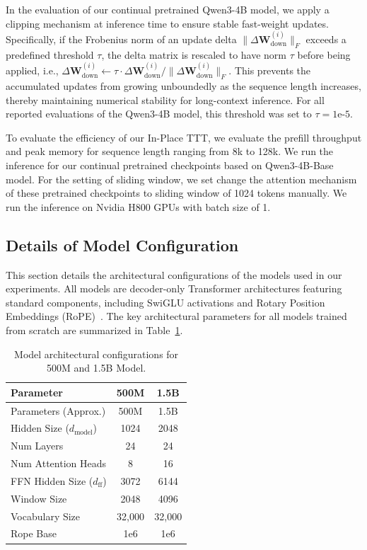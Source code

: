 In the evaluation of our continual pretrained Qwen3-4B model, we apply a clipping mechanism at inference time to ensure stable fast-weight updates. Specifically, if the Frobenius norm of an update delta $\|\Delta \mathbf{W}_{\text{down}}^{(i)}\|_F$ exceeds a predefined threshold $\tau$, the delta matrix is rescaled to have norm $\tau$ before being applied, i.e., $\Delta \mathbf{W}_{\text{down}}^{(i)} \leftarrow \tau \cdot \Delta \mathbf{W}_{\text{down}}^{(i)} / \|\Delta \mathbf{W}_{\text{down}}^{(i)}\|_F$. This prevents the accumulated updates from growing unboundedly as the sequence length increases, thereby maintaining numerical stability for long-context inference. For all reported evaluations of the Qwen3-4B model, this threshold was set to $\tau = 1\text{e-5}$.

To evaluate the efficiency of our In-Place TTT, we evaluate the prefill throughput and peak memory for sequence length ranging from 8k to 128k. We run the inference for our continual pretrained checkpoints based on Qwen3-4B-Base model. For the setting of sliding window, we set change the attention mechanism of these pretrained checkpoints to sliding window of 1024 tokens manually. We run the inference on Nvidia H800 GPUs with batch size of 1.




\subsection{Details of Model Configuration}
\label{app:model}



This section details the architectural configurations of the models used in our experiments. All models are decoder-only Transformer architectures featuring standard components, including SwiGLU activations and Rotary Position Embeddings (RoPE)~\citep{su2023roformer}. The key architectural parameters for all models trained from scratch are summarized in Table~\ref{tab:model_configs}.

\begin{table}[h!]
\centering
\caption{Model architectural configurations for 500M and 1.5B Model.}
\label{tab:model_configs}
\begin{tabular}{lcc}
\toprule
\textbf{Parameter} & \textbf{500M} & \textbf{1.5B}  \\
\midrule
Parameters (Approx.) & 500M & 1.5B  \\
Hidden Size ($d_{\text{model}}$) & 1024 & 2048  \\
Num Layers & 24 & 24  \\
Num Attention Heads & 8 & 16  \\
FFN Hidden Size ($d_{\text{ff}}$) & 3072 & 6144  \\
Window Size & 2048 & 4096 \\
Vocabulary Size & {32,000} & 32,000 \\
Rope Base & 1e6 & 1e6 \\
\bottomrule
\end{tabular}
\end{table}

